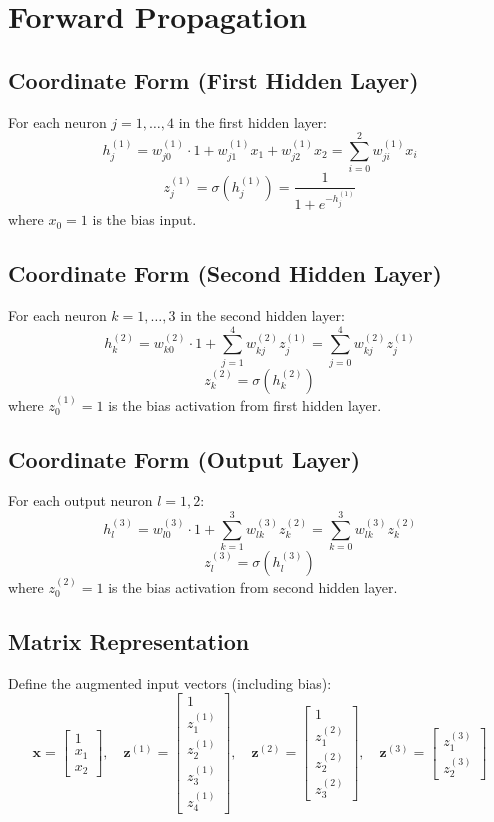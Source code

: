 \documentclass{tufte-handout}
\begin{document}
\section{Forward Propagation}

\subsection{Coordinate Form (First Hidden Layer)}
For each neuron $j = 1,\dots,4$ in the first hidden layer:
\[
h^{(1)}_j = w^{(1)}_{j0} \cdot 1 + w^{(1)}_{j1} x_1 + w^{(1)}_{j2} x_2 = \sum_{i=0}^{2} w^{(1)}_{ji} x_i
\]
\[
z^{(1)}_j = \sigma\left(h^{(1)}_j\right) = \frac{1}{1+e^{-h^{(1)}_j}}
\]
where $x_0 = 1$ is the bias input.

\subsection{Coordinate Form (Second Hidden Layer)}
For each neuron $k = 1,\dots,3$ in the second hidden layer:
\[
h^{(2)}_k = w^{(2)}_{k0} \cdot 1 + \sum_{j=1}^{4} w^{(2)}_{kj} z^{(1)}_j = \sum_{j=0}^{4} w^{(2)}_{kj} z^{(1)}_j
\]
\[
z^{(2)}_k = \sigma\left(h^{(2)}_k\right)
\]
where $z^{(1)}_0 = 1$ is the bias activation from first hidden layer.

\subsection{Coordinate Form (Output Layer)}
For each output neuron $l = 1,2$:
\[
h^{(3)}_l = w^{(3)}_{l0} \cdot 1 + \sum_{k=1}^{3} w^{(3)}_{lk} z^{(2)}_k = \sum_{k=0}^{3} w^{(3)}_{lk} z^{(2)}_k
\]
\[
z^{(3)}_l = \sigma\left(h^{(3)}_l\right)
\]
where $z^{(2)}_0 = 1$ is the bias activation from second hidden layer.

\subsection{Matrix Representation}
Define the augmented input vectors (including bias):
\[
\mathbf{x} = \begin{bmatrix} 1 \\ x_1 \\ x_2 \end{bmatrix}, \quad
\mathbf{z}^{(1)} = \begin{bmatrix} 1 \\ z^{(1)}_1 \\ z^{(1)}_2 \\ z^{(1)}_3 \\ z^{(1)}_4 \end{bmatrix}, \quad
\mathbf{z}^{(2)} = \begin{bmatrix} 1 \\ z^{(2)}_1 \\ z^{(2)}_2 \\ z^{(2)}_3 \end{bmatrix}, \quad
\mathbf{z}^{(3)} = \begin{bmatrix} z^{(3)}_1 \\ z^{(3)}_2 \end{bmatrix}
\]
\end{document}
